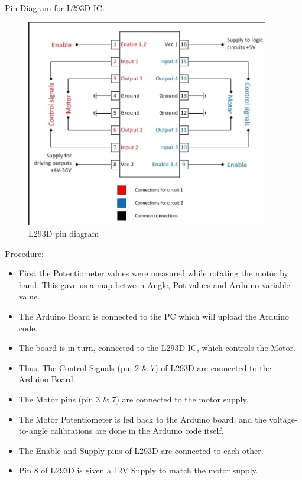 \documentclass[12pt]{report}
\begin{document}
\newpage

Pin Diagram for L293D IC:\\

\begin{figure}[h!]
\center
\includegraphics[width=300pt]{Pin.png}
\caption{L293D pin diagram}
\end{figure}

Procedure:\\

\begin{itemize}

\item First the Potentiometer values were measured while rotating the motor by hand. This gave us a map between Angle, Pot values and Arduino variable value.

\item The Arduino Board is connected to the PC which will upload the Arduino code.

\item The board is in turn, connected to the L293D IC, which controls the Motor.

\item Thus, The Control Signals (pin 2 \& 7) of L293D are connected to the Arduino Board.

\item The Motor pins (pin 3 \& 7) are connected to the motor supply.

\item The Motor Potentiometer is fed back to the Arduino board, and the voltage-to-angle calibrations are done in the Arduino code itself.

\item The Enable and Supply pins of L293D are connected to each other.

\item Pin 8 of L293D is given a 12V Supply to match the motor supply.

\end{itemize}
\end{document}
